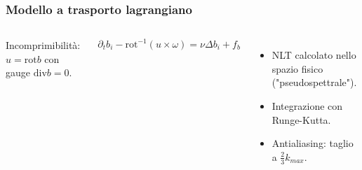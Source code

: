 \begin{frame}
  \frametitle{Modello a trasporto lagrangiano}

  \begin{columns}

    Incomprimibilità: \( u = \mathrm{rot} b\) con gauge \( \mathrm{div} b = 0 \).

    \[ \partial_t b_i - \mathrm{rot}^{-1}(u\times\omega) = \nu\Delta b_i + f_b \] 



    \begin{itemize}
      \item NLT calcolato nello spazio fisico ("pseudospettrale").
      \item Integrazione con Runge-Kutta.
      \item Antialiasing: taglio a \( \frac{2}{3}k_{max} \).
    \end{itemize}

  \end{columns}
\end{frame}

